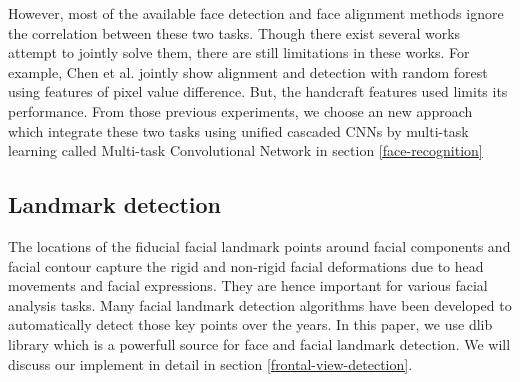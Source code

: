 \documentclass[journal, twocolumn]{IEEEtran}
\begin{document}
However, most of the available face detection and face alignment methods ignore the correlation between these two tasks. Though there exist several works attempt to jointly solve them, there are still limitations in these works. For example, Chen et al. \cite{ref:detect-14} jointly show alignment and detection with random forest using features of pixel value difference. But, the handcraft features used limits its performance. From those previous experiments, we choose an new approach which integrate these two tasks using unified cascaded CNNs by multi-task learning called Multi-task Convolutional Network in section \ref{face-recognition}


\subsection{Landmark detection}
The locations of the fiducial facial landmark points around facial components and facial contour capture  the  rigid  and  non-rigid  facial  deformations  due to  head  movements  and  facial  expressions.  They  are hence important for various facial analysis tasks. Many facial landmark detection algorithms have been developed to automatically detect those key points over the years. In this paper, we use dlib library which is a powerfull source for face and facial landmark detection. We will discuss our implement in detail in section \ref{frontal-view-detection}.
\end{document}
